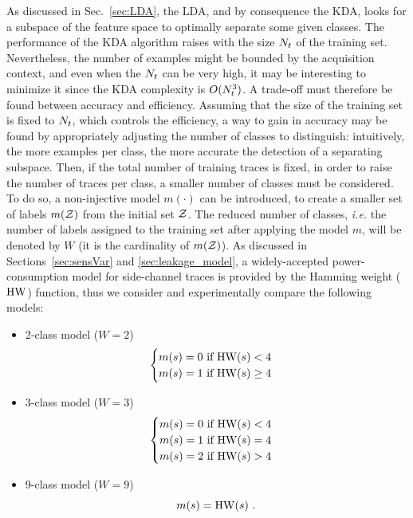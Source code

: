 As discussed in Sec.~\ref{sec:LDA}, the LDA, and by consequence the KDA, looks for a subspace of the feature space to optimally separate some given classes. The performance of the KDA algorithm raises with the size $N_t$ of the training set. Nevertheless, the number of examples might be bounded by the acquisition context, and even when the $N_t$ can be very high, it may be interesting to minimize it since the KDA complexity is $O(N_t^3)$. A trade-off must therefore be found between accuracy and efficiency. Assuming that the size of the training set  is fixed to $N_t$, which controls the efficiency, a way to gain in accuracy may be found by appropriately adjusting the number of classes to distinguish: intuitively, the more examples per class, the more accurate the detection of a separating subspace. Then, if the total number of training traces is fixed, in order to raise the number of traces per class, a smaller number of classes must be considered. To do so, a non-injective model $m(\cdot)$ can be introduced, to create a smaller set of labels $m(\mathcal{Z})$ from the initial set $\mathcal{Z}$. The reduced number of classes, \emph{i.e.} the number of labels assigned to the training set after applying the model $m$, will be denoted by $W$ (it is the cardinality of $m(\mathcal{Z})$).  As discussed in Sections~\ref{sec:sensVar} and \ref{sec:leakage_model}, a widely-accepted power-consumption model for side-channel traces is provided by the Hamming weight ($\mathrm{HW}$) function, thus we consider and experimentally compare the following models:
\begin{itemize}
\item 2-class model ($W = 2$)
\begin{equation*}
\begin{cases}
m(s) =0 \mbox{ if } \mathrm{HW}(s)<4 \\
m(s) =1 \mbox{ if } \mathrm{HW}(s)\geq 4
\end{cases}
\end{equation*}

\item 3-class model ($W = 3$)
\begin{equation*}
\begin{cases}
m(s) =0 \mbox{ if } \mathrm{HW}(s)<4 \\
m(s) =1 \mbox{ if } \mathrm{HW}(s) = 4\\
m(s) =2 \mbox{ if } \mathrm{HW}(s)>4 
\end{cases}
\end{equation*}

\item 9-class model ($W = 9$)
\begin{equation*}
m(s) = \mathrm{HW}(s) \mbox{ .} 
\end{equation*}

\end{itemize}

